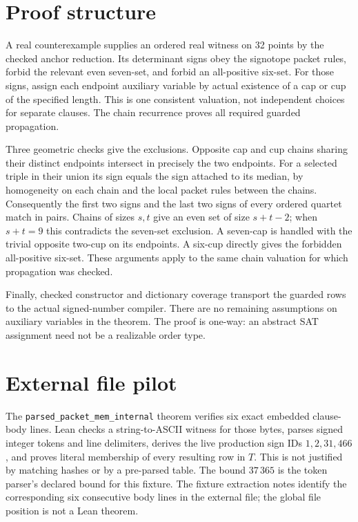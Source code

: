 \documentclass[11pt,letterpaper]{article}
\begin{document}
\section*{Proof structure}
A real counterexample supplies an ordered real witness on 32 points by
the checked anchor reduction. Its determinant signs obey the signotope
packet rules, forbid the relevant even seven-set, and forbid an
all-positive six-set. For those signs, assign each endpoint auxiliary
variable by actual existence of a cap or cup of the specified length.
This is one consistent valuation, not independent choices for separate
clauses. The chain recurrence proves all required guarded propagation.

Three geometric checks give the exclusions. Opposite cap and cup
chains sharing their distinct endpoints intersect in precisely the
two endpoints. For a selected triple in their union its sign equals the
sign attached to its median, by homogeneity on each chain and the
local packet rules between the chains. Consequently the first two
signs and the last two signs of every ordered quartet match in pairs.
Chains of sizes \(s,t\) give an even set of size \(s+t-2\); when
\(s+t=9\) this contradicts the seven-set exclusion. A seven-cap is
handled with the trivial opposite two-cup on its endpoints. A six-cup
directly gives the forbidden all-positive six-set. These arguments apply
to the same chain valuation for which propagation was checked.

Finally, checked constructor and dictionary coverage transport the
guarded rows to the actual signed-number compiler. There are no
remaining assumptions on auxiliary variables in the theorem.
The proof is one-way: an abstract SAT assignment need not be a
realizable order type.

\section*{External file pilot}
The \texttt{parsed\_packet\_mem\_internal} theorem verifies six exact
embedded clause-body lines. Lean checks a string-to-ASCII witness for
those bytes, parses signed integer tokens and line delimiters, derives
the live production sign IDs \(1,2,31,466\), and proves literal membership
of every resulting row in \(T\). This is not justified by matching
hashes or by a pre-parsed table. The bound \(37\,365\) is the token
parser's declared bound for this fixture. The fixture extraction notes
identify the corresponding six consecutive body lines in the external
file; the global file position is not a Lean theorem.
\end{document}
